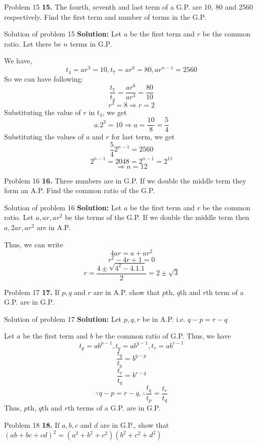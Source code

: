 \documentclass[aspectratio=1610,8pt]{beamer}
\begin{document}
\begin{frame}{Problem 15}
  \textbf{15.} The fourth, seventh and last term of a G.P. are 10, 80 and 2560
  respectively. Find the first term and number of terms in the G.P.
\end{frame}
\begin{frame}{Solution of problem 15}
  \textbf{Solution:} Let $a$ be the first term and $r$ be the common ratio. Let
  there be $n$ terms in G.P.
  
  We have, $$t_4 = ar^3 = 10, t_7 = ar^6 = 80, ar^{n - 1} = 2560$$
  So we can have following:
  $$\frac{t_7}{t_4} = \frac{ar^6}{ar^3} = \frac{80}{10}$$
  $$r^3 = 8\Rightarrow r = 2$$
  Substituting the value of $r$ in $t_4$, we get
  $$a.2^3 = 10\Rightarrow a = \frac{10}{8} = \frac{5}{4}$$
  Substituting the values of $a$ and $r$ for last term, we get
  $$\frac{5}{4}2^{n - 1} = 2560$$
  $$2^{n - 1} = 2048 = 2^{n - 1} = 2^{11}$$
  $$\Rightarrow n = 12$$
\end{frame}
\begin{frame}{Problem 16}
  \textbf{16.} Three numbers are in G.P. If we double the middle term they form
  an A.P. Find the common ratio of the G.P.
\end{frame}
\begin{frame}{Solution of problem 16}
  \textbf{Solution:} Let $a$ be the first term and $r$ be the common ratio. Let
  $a, ar, ar^2$ be the terms of the G.P. If we double the middle term then $a,
  2ar, ar^2$ are in A.P.

  Thus, we can write $$4ar = a + ar^2$$
  $$r^2 - 4r + 1 = 0$$
  $$r = \frac{4 \pm \sqrt{4^2 - 4.1.1}}{2} = 2\pm \sqrt{3}$$
\end{frame}
\begin{frame}{Problem 17}
  \textbf{17.} If $p, q$ and $r$ are in A.P. show that $p$th, $q$th and $r$th
  term of a G.P. are in G.P.
\end{frame}
\begin{frame}{Solution of problem 17}
  \textbf{Solution:} Let $p, q, r$ be in A.P. i.e. $q - p = r - q$

  Let $a$ be the first term and $b$ be the common ratio of G.P. Thus, we have
  $$t_p = ab^{p - 1}, t_q = ab^{q - 1}, t_r = ab^{r - 1}$$
  $$\frac{t_q}{t_p} = b^{q - p}$$
  $$\frac{t_r}{t_q} = b^{r - q}$$
  $$\because q - p = r - q, \therefore \frac{t_q}{t_p} = \frac{t_r}{t_q}$$
  Thus, $p$th, $q$th and $r$th terms of a G.P. are in G.P.
\end{frame}
\begin{frame}{Problem 18}
  \textbf{18.} If $a, b, c$ and $d$ are in G.P., show that $(ab + bc + cd)^2 =
  (a^2 + b^2 + c^2)(b^2 + c^2 + d^2)$
\end{frame}
\end{document}
